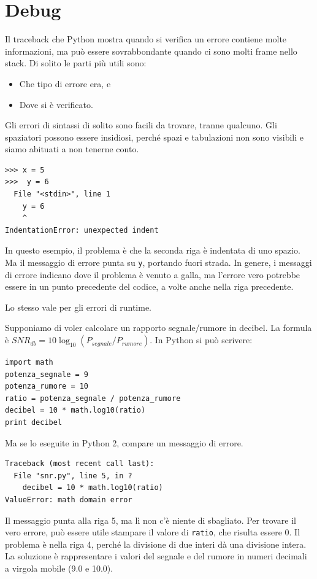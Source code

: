 \documentclass[10pt]{book}
\begin{document}
\section{Debug}
\label{whitespace}

Il traceback che Python mostra quando si verifica un errore contiene molte informazioni, ma può essere sovrabbondante quando ci sono molti frame nello stack. Di solito le parti più utili sono:

\begin{itemize}

\item Che tipo di errore era, e

\item Dove si è verificato.

\end{itemize}

Gli errori di sintassi di solito sono facili da trovare, tranne qualcuno. Gli spaziatori possono essere insidiosi, perché spazi e tabulazioni non sono visibili e siamo abituati a non tenerne conto.

\begin{verbatim}
>>> x = 5
>>>  y = 6
  File "<stdin>", line 1
    y = 6
    ^
IndentationError: unexpected indent
\end{verbatim}
%
In questo esempio, il problema è che la seconda riga è indentata di uno spazio. Ma il messaggio di errore punta su {\tt y}, portando fuori strada. In genere, i messaggi di errore indicano dove il problema è venuto a galla, ma l'errore vero potrebbe essere in un punto precedente del codice, a volte anche nella riga precedente.

Lo stesso vale per gli errori di runtime. 

Supponiamo di voler calcolare un rapporto segnale/rumore in decibel. La formula è
 $SNR_{db} = 10 \log_{10} (P_{segnale} / P_{rumore})$. In Python si può scrivere:

\begin{verbatim}
import math
potenza_segnale = 9
potenza_rumore = 10
ratio = potenza_segnale / potenza_rumore
decibel = 10 * math.log10(ratio)
print decibel
\end{verbatim}
%
Ma se lo eseguite in Python 2, compare un messaggio di errore.

\begin{verbatim}
Traceback (most recent call last):
  File "snr.py", line 5, in ?
    decibel = 10 * math.log10(ratio)
ValueError: math domain error
\end{verbatim}
%
Il messaggio punta alla riga 5, ma lì non c'è niente di sbagliato. Per trovare il vero errore, può essere utile stampare il valore di {\tt ratio}, che risulta essere 0. Il problema è nella riga 4, perché la divisione di due interi dà una divisione intera. La soluzione è rappresentare i valori del segnale e del rumore in numeri decimali a virgola mobile (9.0 e 10.0).
\end{document}
